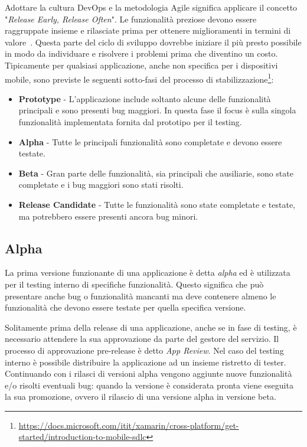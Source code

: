 Adottare la cultura DevOps e la metodologia Agile significa applicare il concetto "\textit{Release Early, Release Often}". Le funzionalità preziose devono essere raggruppate insieme e rilasciate prima per ottenere miglioramenti in termini di valore~\cite{shore2008art}. Questa parte del ciclo di sviluppo dovrebbe iniziare il più presto possibile in modo da individuare e risolvere i problemi prima che diventino un costo. Tipicamente per qualsiasi applicazione, anche non specifica per i dispositivi mobile, sono previste le seguenti sotto-fasi del processo di stabilizzazione\footnote{\href{https://docs.microsoft.com/itit/xamarin/cross-platform/get-started/introduction-to-mobile-sdlc}{https://docs.microsoft.com/itit/xamarin/cross-platform/get-started/introduction-to-mobile-sdlc}}:
\begin{itemize}
    \item \textbf{Prototype} - L'applicazione include soltanto alcune delle funzionalità principali e sono presenti bug maggiori. In questa fase il focus è sulla singola funzionalità implementata fornita dal prototipo per il testing.
    \item \textbf{Alpha} - Tutte le principali funzionalità sono completate e devono essere testate.
    \item \textbf{Beta} - Gran parte delle funzionalità, sia principali che ausiliarie, sono state completate e i bug maggiori sono stati risolti.
    \item \textbf{Release Candidate} - Tutte le funzionalità sono state completate e testate, ma potrebbero essere presenti ancora bug minori.
\end{itemize}

\subsection{Alpha}
La prima versione funzionante di una applicazione è detta \textit{alpha} ed è utilizzata per il testing interno di specifiche funzionalità. Questo significa che può presentare anche bug o funzionalità mancanti ma deve contenere almeno le funzionalità che devono essere testate per quella specifica versione.

Solitamente prima della release di una applicazione, anche se in fase di testing, è necessario attendere la sua approvazione da parte del gestore del servizio. Il processo di approvazione pre-release è detto \textit{App Review}. Nel caso del testing interno è possibile distribuire la applicazione ad un insieme ristretto di tester. Continuando con i rilasci di versioni alpha vengono aggiunte nuove funzionalità e/o risolti eventuali bug: quando la versione è considerata pronta viene eseguita la sua promozione, ovvero il rilascio di una versione alpha in versione beta.

